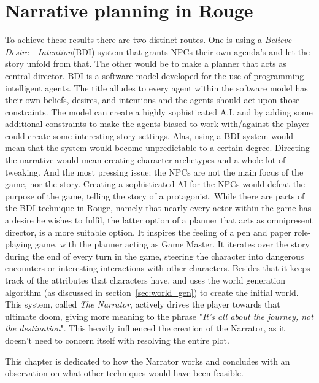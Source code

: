 \section{Narrative planning in Rouge}
To achieve these results there are two distinct routes. 
One is using a \textit{Believe - Desire - Intention}(BDI) system that grants NPCs their own agenda's and let the story unfold from that. 
The other would be to make a planner that acts as central director. 
BDI is a software model developed for the use of programming intelligent agents. The title alludes to every agent within the software model has their own beliefs, desires, and intentions and the agents should act upon those constraints. 
The model can create a highly sophisticated A.I. and by adding some additional constraints to make the agents biased to work with/against the player could create some interesting story settings.
Alas, using a BDI system would mean that the system would become unpredictable to a certain degree.
Directing the narrative would mean creating character archetypes and a whole lot of tweaking.
And the most pressing issue: the NPCs are not the main focus of the game, nor the story.
Creating a sophisticated AI for the NPCs would defeat the purpose of the game, telling the story of a protagonist.
While there are parts of the BDI technique in Rouge, namely that nearly every actor within the game has a desire he wishes to fulfil, the latter option of a planner that acts as omnipresent director, is a more suitable option.
It inspires the feeling of a pen and paper role-playing game, with the planner acting as Game Master.
It iterates over the story during the end of every turn in the game, steering the character into dangerous encounters or interesting interactions with other characters. 
Besides that it keeps track of the attributes that characters have, and uses the world generation algorithm (as discussed in section~\ref{sec:world_gen}) to create the initial world.
This system, called \textit{The Narrator}, actively drives the player towards that ultimate doom, giving more meaning to the phrase "\textit{It's all about the journey, not the destination}". 
This heavily influenced the creation of the Narrator, as it doesn't need to concern itself with resolving the entire plot.

This chapter is dedicated to how the Narrator works and concludes with an observation on what other techniques would have been feasible.

